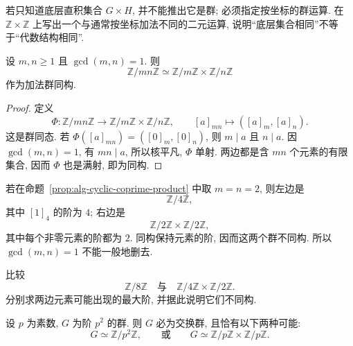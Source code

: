 \documentclass[usesamecnt, thmcnt=section, lang=cn, newtx, 10pt, scheme=chinese]{elegantbook}
\begin{document}
\begin{exercise}\label{ex:alg-product-factors}
若只知道底层直积集合 $G\times H$, 并不能推出它是群; 必须指定按坐标的群运算. 在 $\mathbb Z\times\mathbb Z$ 上写出一个与通常按坐标加法不同的二元运算, 说明``底层集合相同''不等于``代数结构相同''.
\end{exercise}

\begin{proposition}\label{prop:alg-cyclic-coprime-product}
设 $m,n\geq1$ 且 $\gcd(m,n)=1$. 则
\[
 \mathbb Z/mn\mathbb Z
 \simeq
 \mathbb Z/m\mathbb Z\times\mathbb Z/n\mathbb Z
\]
作为加法群同构.
\end{proposition}

\begin{proof}
定义
\[
 \Phi:\mathbb Z/mn\mathbb Z\longrightarrow
 \mathbb Z/m\mathbb Z\times\mathbb Z/n\mathbb Z,
 \qquad
 [a]_{mn}\longmapsto([a]_m,[a]_n).
\]
这是群同态. 若 $\Phi([a]_{mn})=([0]_m,[0]_n)$, 则 $m\mid a$ 且 $n\mid a$. 因 $\gcd(m,n)=1$, 有 $mn\mid a$, 所以核平凡, $\Phi$ 单射. 两边都是含 $mn$ 个元素的有限集合, 因而 $\Phi$ 也是满射, 即为同构.
\end{proof}

\begin{instance}
若在命题~\ref{prop:alg-cyclic-coprime-product} 中取 $m=n=2$, 则左边是
\[
 \mathbb Z/4\mathbb Z,
\]
其中 $[1]_4$ 的阶为 $4$; 右边是
\[
 \mathbb Z/2\mathbb Z\times\mathbb Z/2\mathbb Z,
\]
其中每个非零元素的阶都为 $2$. 同构保持元素的阶, 因而这两个群不同构. 所以 $\gcd(m,n)=1$ 不能一般地删去.
\end{instance}

\begin{exercise}\label{ex:alg-coprime-needed}
比较
\[
 \mathbb Z/8\mathbb Z
 \quad\text{与}\quad
 \mathbb Z/4\mathbb Z\times\mathbb Z/2\mathbb Z.
\]
分别求两边元素可能出现的最大阶, 并据此说明它们不同构.
\end{exercise}

\begin{proposition}\label{prop:alg-abelian-p2}
设 $p$ 为素数, $G$ 为阶 $p^2$ 的群. 则 $G$ 必为交换群, 且恰有以下两种可能:
\[
 G\simeq\mathbb Z/p^2\mathbb Z,
 \qquad\text{或}\qquad
 G\simeq\mathbb Z/p\mathbb Z\times\mathbb Z/p\mathbb Z.
\]
\end{proposition}
\end{document}
